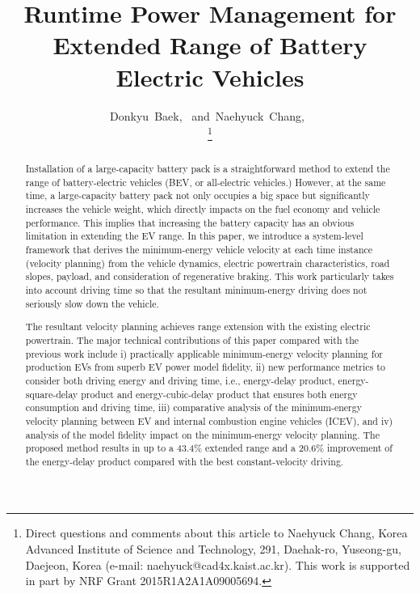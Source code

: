\documentclass{IEEEtran}
\begin{document}
\title{Runtime Power Management for Extended Range of Battery Electric Vehicles}

\author{
Donkyu~Baek,~ 
and~Naehyuck~Chang,~

\thanks{Direct questions and comments about this article to Naehyuck Chang, Korea Advanced Institute of Science and Technology, 291, Daehak-ro, Yuseong-gu, Daejeon, Korea (e-mail: naehyuck@cad4x.kaist.ac.kr). This work is supported in part by NRF Grant 2015R1A2A1A09005694.}
}

\maketitle

\begin{abstract}
Installation of a large-capacity battery pack is a straightforward method to extend the range of battery-electric vehicles (BEV, or all-electric vehicles.) However, at the same time, a large-capacity battery pack not only occupies a big space but significantly increases the vehicle weight, which directly impacts on the  fuel economy and vehicle performance. This implies that increasing the battery capacity has an obvious limitation in extending the EV range. In this paper, we introduce a system-level framework that derives the minimum-energy vehicle velocity at each time instance (velocity planning) from the vehicle dynamics, electric powertrain characteristics, road slopes, payload, and consideration of regenerative braking. This work particularly takes into account driving time so that the resultant minimum-energy driving does not seriously slow down the vehicle. 

The resultant velocity planning achieves range extension with the existing electric powertrain. The major technical contributions of this paper compared with the previous work include i) practically applicable minimum-energy velocity planning for production EVs from superb EV power model fidelity, ii) new performance metrics to consider both driving energy and driving time, i.e., energy-delay product, energy-square-delay product and energy-cubic-delay product that ensures both energy consumption and driving time, iii) comparative analysis of the minimum-energy velocity planning between EV and internal combustion engine vehicles (ICEV), and iv) analysis of the model fidelity impact on the minimum-energy velocity planning. The proposed method results in up to a 43.4\% extended range and a 20.6\% improvement of the energy-delay product compared with the best constant-velocity driving.
\end{abstract}
\end{document}
